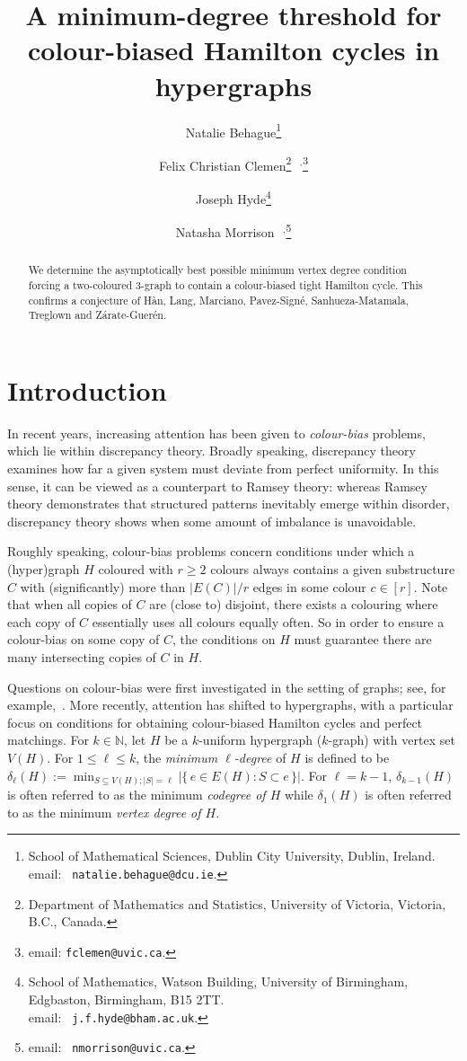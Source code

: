 \documentclass[A4paper,12pt]{article}
\title{A minimum-degree threshold for colour-biased Hamilton cycles in hypergraphs}
\author{Natalie Behague\thanks{School of Mathematical Sciences, Dublin City University, Dublin, Ireland. \\ \indent\indent \hspace{-0.185cm} email: \texttt{ natalie.behague@dcu.ie}. } \and Felix Christian Clemen\thanks{Department of Mathematics and Statistics, University of Victoria, Victoria, B.C., Canada.}$\text{ }^{,}$\thanks{email: \texttt{fclemen@uvic.ca}.} \and Joseph Hyde\thanks{School of Mathematics, Watson Building, University of Birmingham, Edgbaston, Birmingham, B15 2TT. \\ \indent\indent \hspace{-0.185cm}  email: \texttt{ j.f.hyde@bham.ac.uk}.} \and Natasha Morrison\footnotemark[2]$\text{ }^{,}$\thanks{email: \texttt{ nmorrison@uvic.ca}.}}
\theoremstyle{definition}
\begin{document}
\maketitle 
\begin{abstract}
We determine the asymptotically best possible minimum vertex degree condition forcing a two-coloured $3$-graph to contain a colour-biased tight Hamilton cycle. This confirms a conjecture of H\`an, Lang, Marciano, Pavez-Sign\'e, Sanhueza-Matamala, Treglown and Z\'arate-Guer\'en. 
\end{abstract}

\section{Introduction}
In recent years, increasing attention has been given to \textit{colour-bias} problems, which lie within discrepancy theory. Broadly speaking, discrepancy theory examines how far a given system must deviate from perfect uniformity. In this sense, it can be viewed as a counterpart to Ramsey theory: whereas Ramsey theory demonstrates that structured patterns inevitably emerge within disorder, discrepancy theory shows when some amount of imbalance is unavoidable.

Roughly speaking, colour-bias problems concern conditions under which a (hyper)graph $H$ coloured with $r \geq 2$ colours always contains a given substructure $C$ with (significantly) more than $|E(C)|/r$ edges in some colour $c \in [r]$. Note that when all copies of $C$ are (close to) disjoint, there exists a colouring where each copy of $C$ essentially uses all colours equally often. So in order to ensure a colour-bias on some copy of $C$, the conditions on $H$ must guarantee there are many intersecting copies of $C$ in $H$. 

Questions on colour-bias were first investigated in the setting of graphs; see, for example,~\cite{BaloghCsabaJingPluhar2020, BaloghCsabaPluharTreglown2021,Bradac2022,BradaChristophGishboliner2024,FreschiHydeLadaTreglown2021,GishbolinerKrivelevichMichaeli2022b,GishbolinerKrivelevichMichaeli2022}. More recently, attention has shifted to hypergraphs, with a particular focus on conditions for obtaining colour-biased Hamilton cycles and perfect matchings. 
For $k \in \mathbb{N}$, let $H$ be a $k$-uniform hypergraph ($k$-graph) with vertex set $V(H)$.
For $1\leq \ell \leq k$, the \emph{minimum $\ell$-degree} of $H$ is defined to be $\delta_\ell(H) := \min_{S \subseteq V(H); |S| = \ell}\bigl|\{\, e \in E(H) : S \subset e \,\}\bigr|$. 
For $\ell = k-1$, $\delta_{k-1}(H)$ is often referred to as the minimum {\it codegree of $H$} while $\delta_1(H)$ is often referred to as the minimum {\it vertex degree of $H$}.
\end{document}
